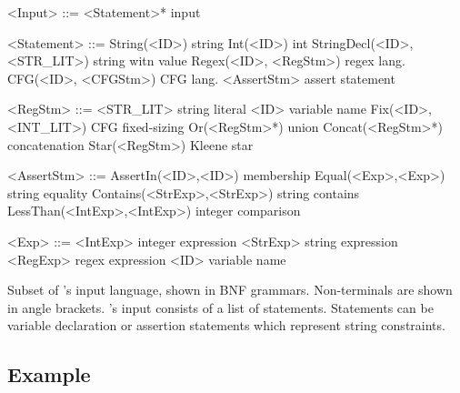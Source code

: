 \begin{Grammar}[H]
    \setlength{\grammarindent}{5em} %
    \begin{grammar}
        <Input> ::= <Statement>*                    \hfill \imss input

        <Statement> ::= String(<ID>)                \hfill string
                \alt Int(<ID>)                      \hfill int
                \alt StringDecl(<ID>, <STR_LIT>)    \hfill string witn value
                \alt Regex(<ID>, <RegStm>)          \hfill regex lang.
                \alt CFG(<ID>, <CFGStm>)            \hfill CFG lang.
                \alt <AssertStm>                    \hfill assert statement

        <RegStm> ::= <STR_LIT>                      \hfill string literal
                \alt <ID>                           \hfill variable name
                \alt Fix(<ID>, <INT_LIT>)           \hfill CFG fixed-sizing
                \alt Or(<RegStm>*)                  \hfill union
                \alt Concat(<RegStm>*)              \hfill concatenation
                \alt Star(<RegStm>)                 \hfill Kleene star

        <AssertStm> ::= AssertIn(<ID>,<ID>)         \hfill membership
                \alt Equal(<Exp>,<Exp>)             \hfill string equality
                \alt Contains(<StrExp>,<StrExp>)    \hfill string contains
                \alt LessThan(<IntExp>,<IntExp>)    \hfill integer comparison

        <Exp> ::= <IntExp>                          \hfill integer expression
                \alt <StrExp>                       \hfill string expression
                \alt <RegExp>                       \hfill regex expression
                \alt <ID>                           \hfill variable name

    \end{grammar}
 \caption{\label{fig:grammar}Subset of \imss's input language, shown in BNF grammars.
 Non-terminals are shown in angle brackets. \imss's input consists of a list of statements.
 Statements can be variable declaration or assertion statements which represent
 string constraints.}
 \end{Grammar}

\subsection{Example}

